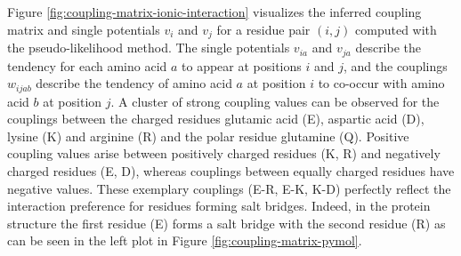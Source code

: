 \documentclass[11pt,a4paper,twoside]{book}
\newcommand{\vi}{v_{i}}
\newcommand{\vj}{v_{j}}
\newcommand{\via}{v_{ia}}
\newcommand{\vja}{v_{ja}}
\newcommand{\wijab}{w_{ijab}}
\theoremstyle{definition}
\theoremstyle{definition}
\theoremstyle{remark}
\begin{document}
Figure \ref{fig:coupling-matrix-ionic-interaction} visualizes the
inferred coupling matrix and single potentials \(\vi\) and \(\vj\) for a
residue pair \((i,j)\) computed with the pseudo-likelihood method. The
single potentials \(\via\) and \(\vja\) describe the tendency for each
amino acid \(a\) to appear at positions \(i\) and \(j\), and the
couplings \(\wijab\) describe the tendency of amino acid \(a\) at
position \(i\) to co-occur with amino acid \(b\) at position \(j\). A
cluster of strong coupling values can be observed for the couplings
between the charged residues glutamic acid (E), aspartic acid (D),
lysine (K) and arginine (R) and the polar residue glutamine (Q).
Positive coupling values arise between positively charged residues (K,
R) and negatively charged residues (E, D), whereas couplings between
equally charged residues have negative values. These exemplary couplings
(E-R, E-K, K-D) perfectly reflect the interaction preference for
residues forming salt bridges. Indeed, in the protein structure the
first residue (E) forms a salt bridge with the second residue (R) as can
be seen in the left plot in Figure \ref{fig:coupling-matrix-pymol}.
\end{document}

